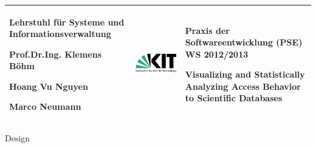 \begin{titlepage}

\vspace*{-3cm}
\begin{center}

\begin{tabular}{m{5.5cm} m{5cm} m{5.5cm}}
\arrayrulecolor{Bittersweet!90}

\begin{center}
\footnotesize{
\textbf{ Lehrstuhl für Systeme und Informationsverwaltung}
\newline

Prof.Dr.Ing. Klemens Böhm

Hoang Vu Nguyen

Marco Neumann
} 	
\end{center}
   & 
\begin{center}

   \includegraphics[width=0.9\linewidth]{Pictures/KIT-Logo.png}
   
\end{center}    
   & 
\begin{center}
\footnotesize{
\textbf{Praxis der Softwareentwicklung (PSE)}\newline
WS 2012/2013\newline

Visualizing and Statistically Analyzing Access Behavior to Scientific Databases
}
\end{center}\\
\hline
 
\end{tabular}


\vspace*{4.6cm}

\Huge
Design

\vspace*{1.5cm}

\normalsize

\begin{center}


\end{center}
\end{center}
\end{titlepage}
